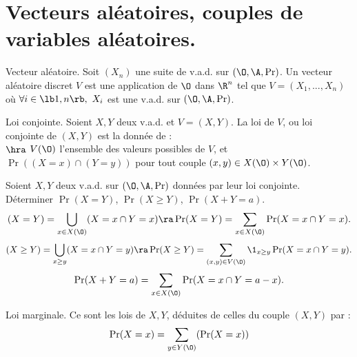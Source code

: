 \documentclass[11pt]{article}
\begin{document}
\section{Vecteurs aléatoires, couples de variables aléatoires.}


\begin{defi}{Vecteur aléatoire.}{}
    Soit $(X_n)$ une suite de v.a.d. sur $(\O,\A,\Pr)$. Un vecteur aléatoire discret $V$ est une application de $\O$ dans $\R^n$ tel que $V=(X_1,...,X_n)$ où $\forall i \in \lb1,n\rb, ~ X_i$ est une v.a.d. sur $(\O,\A,\Pr)$.
\end{defi}

\begin{defi}{Loi conjointe.}{}
    Soient $X,Y$ deux v.a.d. et $V=(X,Y)$. La loi de $V$, ou loi conjointe de $(X,Y)$ est la donnée de :\\
    $\hra$ $V(\O)$ l'ensemble des valeurs possibles de $V$, et $\Pr((X=x)\cap(Y=y))$ pour tout couple $(x,y)\in X(\O)\times Y(\O)$.
\end{defi}

\begin{exercice}{}{}
    Soient $X,Y$ deux v.a.d. sur $(\O,\A,\Pr)$ données par leur loi conjointe.\\
    Déterminer $\Pr(X=Y)$, $\Pr(X\geq Y)$, $\Pr(X+Y=a)$.
    \tcblower
    \begin{equation*}
        (X=Y) = \bigcup_{x\in X(\O)}(X=x\cap Y=x) \ra \Pr(X=Y) = \sum_{x\in X(\O)}\Pr(X=x \cap Y=x).
    \end{equation*} 
    \begin{equation*}
        (X\geq Y) = \bigcup_{x\geq y}(X=x\cap Y = y) \ra \Pr(X\geq Y) = \sum_{(x,y)\in V(\O)}\1_{x\geq y}\Pr(X=x\cap Y=y).
    \end{equation*}
    \begin{equation*}
        \Pr(X+Y=a) = \sum_{x\in X(\O)} \Pr(X=x \cap Y=a-x).
    \end{equation*}
\end{exercice}

\begin{defi}{Loi marginale.}{}
    Ce sont les lois de $X,Y$, déduites de celles du couple $(X,Y)$ par :
    \begin{equation*}
        \Pr(X=x) = \sum_{y\in Y(\O)}(\Pr(X=x))
    \end{equation*}
\end{defi}
\end{document}
